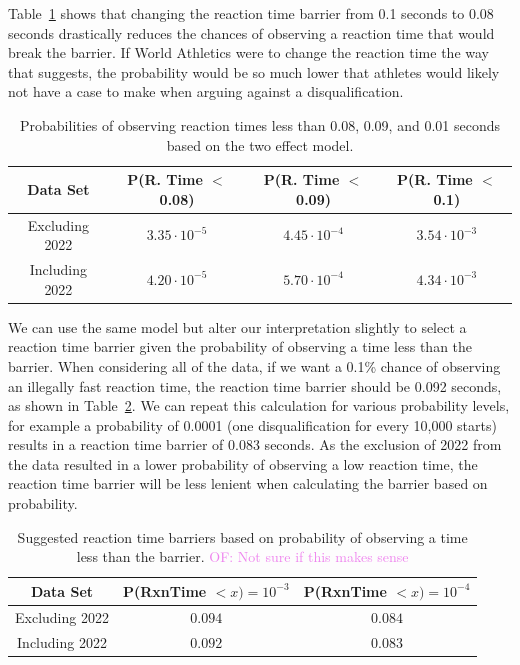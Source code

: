 \documentclass[12pt, letterpaper, titlepage]{article}
\newcommand{\of}[1]{\textcolor{violet}{OF: #1}}
\begin{document}
Table~\ref{tab:Sim_probability} shows that changing the reaction time 
barrier from 0.1 seconds to 0.08 seconds drastically reduces the chances of 
observing a reaction time that would break the barrier. If World Athletics were
to change the reaction time the way that \citet{komi2009iaaf} suggests, the 
probability would be so much lower that athletes would likely not
have a case to make when arguing against a disqualification.


\begin{table}
  \centering
  \caption{Probabilities of observing reaction times less than 0.08, 0.09, and
  0.01 seconds based on the two effect model.}
  \begin{tabular}{c c c c} 
   \toprule
   Data Set & P(R. Time $<$ 0.08) & P(R. Time $<$ 0.09) & P(R. Time $<$ 0.1)  \\ 
   \midrule
   Excluding 2022 & $3.35\cdot10^{-5}$ & $4.45\cdot10^{-4}$ &  $3.54\cdot10^{-3}$  \\ 
   Including 2022 & $4.20\cdot10^{-5}$ & $5.70\cdot10^{-4}$ & $4.34\cdot10^{-3}$ \\
   \bottomrule
  \end{tabular}
  \label{tab:Sim_probability}
\end{table}

We can use the same model but alter our interpretation slightly to select a 
reaction time barrier given the probability of observing a time less than the 
barrier.  When considering all of the data, if we want a 0.1\% chance of 
observing an illegally fast reaction time, the reaction
time barrier should be 0.092 seconds, as shown in Table~\ref{tab:Sim_time}.  We
can repeat this calculation for various probability levels,
for example a probability of 0.0001 (one disqualification for every 10,000 starts)
results in a reaction time barrier of 0.083 seconds.  As the exclusion of 2022
from the data resulted in a lower probability of observing a low reaction time,
the reaction time barrier will be less lenient when calculating the barrier
based on probability.


\begin{table}
  \centering
  \caption{Suggested reaction time barriers based on probability of observing
  a time less than the barrier. \of{Not sure if this makes sense}}
  \begin{tabular}{c c c} 
   \toprule
   Data Set & P(RxnTime $< x) = 10^{-3}$ & P(RxnTime $< x) = 10^{-4}$ \\ 
   \midrule
   Excluding 2022 & $0.094$ & $0.084$ \\ 
   Including 2022 & $0.092$ & $0.083$ \\
   \bottomrule
  \end{tabular}
  \label{tab:Sim_time}
\end{table}
\end{document}
